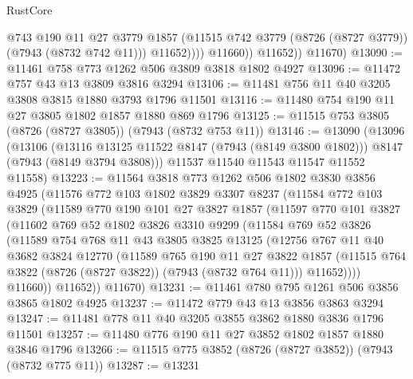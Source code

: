 \begin{lexlean}{RustCore}
\begin{coremodule}
                      @743
                      @190
                      @11
                      @27
                      @3779
                      @1857
                      (@11515 @742 @3779 (@8726 (@8727 @3779)) (@7943 (@8732 @742 @11)))
                      @11652))))
              @11660))
          @11652))
      @11670)
@13090 := @11461 @758 @773 @1262 @506 @3809 @3818 @1802 @4927
@13096 := @11472 @757 @43 @13 @3809 @3816 @3294
@13106 := @11481 @756 @11 @40 @3205 @3808 @3815 @1880 @3793 @1796 @11501
@13116 := @11480 @754 @190 @11 @27 @3805 @1802 @1857 @1880 @869 @1796
@13125 := @11515 @753 @3805 (@8726 (@8727 @3805)) (@7943 (@8732 @753 @11))
@13146 := @13090
    (@13096
      (@13106
        (@13116 @13125 @11522 @8147 (@7943 (@8149 @3800 @1802)))
        @8147
        (@7943 (@8149 @3794 @3808)))
      @11537
      @11540
      @11543
      @11547
      @11552
      @11558)
@13223 := @11564
    @3818
    @773
    @1262
    @506
    @1802
    @3830
    @3856
    @4925
    (@11576
      @772
      @103
      @1802
      @3829
      @3307
      @8237
      (@11584
        @772
        @103
        @3829
        (@11589
          @770
          @190
          @101
          @27
          @3827
          @1857
          (@11597
            @770
            @101
            @3827
            (@11602
              @769
              @52
              @1802
              @3826
              @3310
              @9299
              (@11584
                @769
                @52
                @3826
                (@11589
                  @754
                  @768
                  @11
                  @43
                  @3805
                  @3825
                  @13125
                  (@12756
                    @767
                    @11
                    @40
                    @3682
                    @3824
                    @12770
                    (@11589
                      @765
                      @190
                      @11
                      @27
                      @3822
                      @1857
                      (@11515 @764 @3822 (@8726 (@8727 @3822)) (@7943 (@8732 @764 @11)))
                      @11652))))
              @11660))
          @11652))
      @11670)
@13231 := @11461 @780 @795 @1261 @506 @3856 @3865 @1802 @4925
@13237 := @11472 @779 @43 @13 @3856 @3863 @3294
@13247 := @11481 @778 @11 @40 @3205 @3855 @3862 @1880 @3836 @1796 @11501
@13257 := @11480 @776 @190 @11 @27 @3852 @1802 @1857 @1880 @3846 @1796
@13266 := @11515 @775 @3852 (@8726 (@8727 @3852)) (@7943 (@8732 @775 @11))
@13287 := @13231

\end{coremodule}
\end{lexlean}
